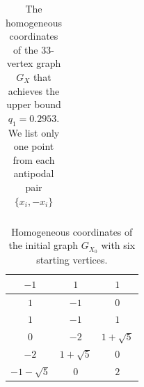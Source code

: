 \documentclass[11pt]{amsart}
\numberwithin{equation}{section}
\begin{document}
\begin{table}[]
{\begin{tabular}{|c|c|c|}
\end{tabular}
}

    \caption{The homogeneous coordinates of the 33-vertex graph $G_X$ that achieves the upper bound $q_1=0.2953$. We list only one point from each antipodal pair $\{x_i, -x_i\}$}
    \label{coord}
\end{table}




\begin{table}[]
    \centering
{\tiny
\begin{tabular}{|c|c|c|}
\hline
$-1$ & $1$ & $1$ \\
\hline
$1$ & $-1$ & $0$ \\
\hline
$1$ & $-1$ & $1$ \\
\hline
$0$ & $-2$ & $1+\sqrt{5}$ \\
\hline
$-2$ & $1+\sqrt{5}$ & $0$ \\
\hline
$-1-\sqrt{5}$ & $0$ & $2$ \\
\hline
\end{tabular}
}
\caption{Homogeneous coordinates of the initial graph $G_{X_0}$ with six starting vertices.}
    \label{tab:Sphere_init_coordinates}
\end{table}
\end{document}
